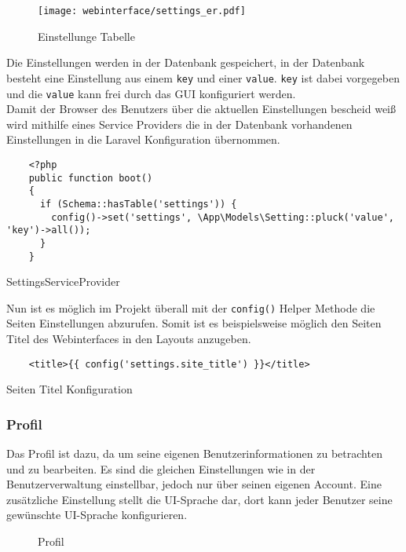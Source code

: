 \begin{figure}[H]
  \centering
  \texttt{[image: webinterface/settings\_er.pdf]}
  \caption{Einstellunge Tabelle}
\end{figure}

Die Einstellungen werden in der Datenbank gespeichert, in der Datenbank besteht eine Einstellung
aus einem \verb|key| und einer \verb|value|. \verb|key| ist dabei vorgegeben und
die \verb|value| kann frei durch das GUI konfiguriert werden.\\

Damit der Browser des Benutzers über die aktuellen Einstellungen bescheid weiß
wird mithilfe eines Service Providers die in der Datenbank vorhandenen
Einstellungen in die Laravel Konfiguration übernommen.

\begin{listing}[H]
  \begin{verbatim}
    <?php
    public function boot()
    {
      if (Schema::hasTable('settings')) {
        config()->set('settings', \App\Models\Setting::pluck('value', 'key')->all());
      }
    }
  \end{verbatim}
  \caption{SettingsServiceProvider}
\end{listing}

Nun ist es möglich im Projekt überall mit der \verb|config()| Helper Methode die
Seiten Einstellungen abzurufen. Somit ist es beispielsweise möglich den Seiten
Titel des Webinterfaces in den Layouts anzugeben.

\begin{listing}[H]
  \begin{verbatim}
    <title>{{ config('settings.site_title') }}</title>
  \end{verbatim}
  \caption{Seiten Titel Konfiguration}
\end{listing}

\subsubsection{Profil}\label{sec:profile}
Das Profil ist dazu, da um seine eigenen Benutzerinformationen zu betrachten und
zu bearbeiten. Es sind die gleichen Einstellungen wie in der Benutzerverwaltung
einstellbar, jedoch nur über seinen eigenen Account. Eine zusätzliche
Einstellung stellt die UI-Sprache dar, dort kann jeder Benutzer seine gewünschte
UI-Sprache konfigurieren.\\

\begin{figure}[H]
  \centering
  \caption{Profil}
\end{figure}

